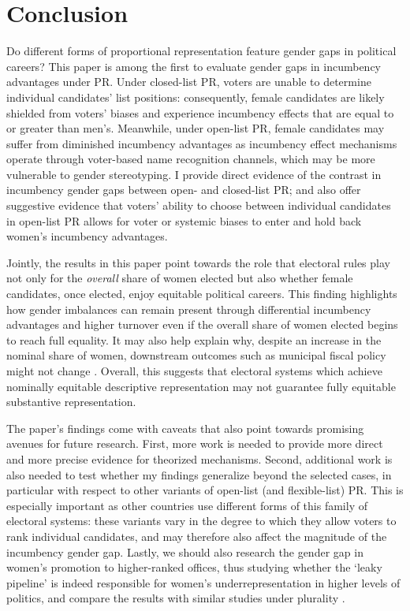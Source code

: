 \documentclass[12pt]{article}
\begin{document}
\section{Conclusion}

Do different forms of proportional representation feature gender gaps in political careers? This paper is among the first to evaluate gender gaps in incumbency advantages under PR.
Under closed-list PR, voters are unable to determine individual candidates' list positions: consequently, female candidates are likely shielded from voters' biases and experience incumbency effects that are equal to or greater than men's. Meanwhile, under open-list PR, female candidates may suffer from diminished incumbency advantages as incumbency effect mechanisms operate through voter-based name recognition channels, which may be more vulnerable to gender stereotyping. I provide direct evidence of the contrast in incumbency gender gaps between open- and closed-list PR; and also offer suggestive evidence that voters' ability to choose between individual candidates in open-list PR allows for voter or systemic biases to enter and hold back women's incumbency advantages.

Jointly, the results in this paper point towards the role that electoral rules play not only for the \emph{overall} share of women elected but also whether female candidates, once elected, enjoy equitable political careers. This finding highlights how gender imbalances can remain present through differential incumbency advantages and higher turnover even if the overall share of women elected begins to reach full equality. It may also help explain why, despite an increase in the nominal share of women, downstream outcomes such as municipal fiscal policy might not change \citep{ferreira2014,bagues2020}. Overall, this suggests that electoral systems which achieve nominally equitable descriptive representation may not guarantee fully equitable substantive representation.

The paper's findings come with caveats that also point towards promising avenues for future research. First, more work is needed to provide more direct and more precise evidence for theorized mechanisms.
Second, additional work is also needed to test whether my findings generalize beyond the selected cases, in particular with respect to other variants of open-list (and flexible-list) PR. This is especially important as other countries use different forms of this family of electoral systems: these variants vary in the degree to which they allow voters to rank individual candidates, and may therefore also affect the magnitude of the incumbency gender gap. Lastly, we should also research the gender gap in women's promotion to higher-ranked offices, thus studying whether the `leaky pipeline' is indeed responsible for women's underrepresentation in higher levels of politics, and compare the results with similar studies under plurality \citep{wasserman2020,brown2019,cipullo2021}.
\end{document}
